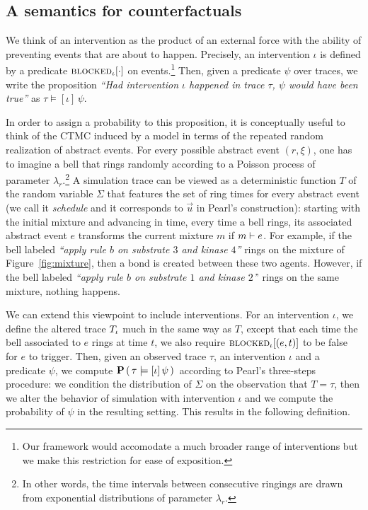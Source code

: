 \subsection{A semantics for counterfactuals}
\label{sec:counterfactuals-semantics}
We think of an intervention as the product of an external force with
the ability of preventing events that are about to happen. Precisely,
an intervention $\iota$ is defined by a predicate
${\textsc{blocked}}_{\iota}[\cdot]$ on events.\footnote{Our framework would
  accomodate a much broader range of interventions but we make this
  restriction for ease of exposition.}  Then, given a predicate $\psi$
over traces, we write the proposition \textit{``Had
  intervention $\iota$ happened in trace $\tau$, $\psi$ would have
  been true''} as $\tau \models [\iota] \, \psi.$


In order to assign a probability to this proposition, it is
conceptually useful to think of the CTMC induced by a model in terms
of the repeated random realization of abstract events.  For every
possible abstract event $(r, \xi)$, one has to imagine a bell that
rings randomly according to a Poisson process of parameter
$\lambda_r$.\footnote{In other words, the time intervals between
  consecutive ringings are drawn from exponential distributions of
  parameter $\lambda_r$.}  A simulation trace can be viewed as a
deterministic function $T$ of the random variable $\Sigma$ that
features the set of ring times for every abstract event (we call it
\emph{schedule} and it corresponds to $\vec{u}$ in Pearl's
construction): starting with the initial mixture and advancing in
time, every time a bell rings, its associated abstract event $e$
transforms the current mixture $m$ if $m \vdash e$. For
example, if the bell labeled \textit{``apply rule $b$ on substrate $3$
  and kinase $4$''} rings on the mixture of Figure~\ref{fig:mixture},
then a bond is created between these two agents. However, if the bell
labeled \textit{``apply rule $b$ on substrate $1$ and kinase $2$'}'
rings on the same mixture, nothing happens.

We can extend this viewpoint to include interventions. For an
intervention $\iota$, we define the altered trace ${T_\iota}{}$ much in
the same way as $T$, except that each time the bell associated to $e$
rings at time $t$, we also require ${\textsc{blocked}}_{\iota}[(e, t)]$ to be
false for $e$ to trigger. Then, given an observed trace $\tau$, an
intervention $\iota$ and a predicate $\psi$, we compute $\mathbf{P}\left( \,\tau \models [\iota] \, \psi \,\right){}$
according to Pearl's three-steps procedure: \ItAbduction{} we condition
the distribution of $\Sigma$ on the observation that $T=\tau$, then
\ItAction{} we alter the behavior of simulation with intervention $\iota$
and \ItPrediction{} we compute the probability of $\psi$ in the resulting
setting. This results in the following definition.

